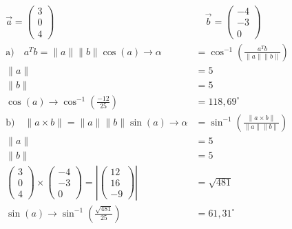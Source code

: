 \documentclass[a4paper]{article}
\begin{document}
  \subsection{}
    \begin{align*}
      \vec{a} =
      \begin{pmatrix}
        3 \\ 0 \\ 4
      \end{pmatrix}
      &\quad
      \vec{b} =
      \begin{pmatrix}
        -4 \\ -3 \\ 0
      \end{pmatrix}
      \\[1em]
      \text{a)}\quad a^Tb = \|a\|\|b\|\cos{(a)}\rightarrow \alpha &= \cos^{-1} (\frac{a^Tb}{\|a\|\|b\|}) \\[1em]
      \|a\| &= 5 \\[1em]
      \|b\| &= 5 \\[1em]
      \cos{(a)} \rightarrow \cos^{-1}(\frac{-12}{25}) &= 118,69^\circ
      \\[1em]
      \text{b)}\quad \|a \times b\| = \|a\|\|b\|\sin{(a)}\rightarrow \alpha &= \sin^{-1} (\frac{\|a \times b\|}{\|a\|\|b\|}) \\[1em]
      \|a\| &= 5 \\[1em]
      \|b\| &= 5 \\[1em]
      \begin{pmatrix}
        3 \\ 0 \\ 4
      \end{pmatrix}
      \times
      \begin{pmatrix}
        -4 \\ -3 \\ 0
      \end{pmatrix}
      =
      \left|\begin{pmatrix}
        12 \\ 16 \\ -9
      \end{pmatrix}\right|
      &= \sqrt{481}
      \\[1em]
      \sin{(a)} \rightarrow \sin^{-1}(\frac{\sqrt{481}}{25}) &= 61,31^\circ
    \end{align*}
\end{document}
